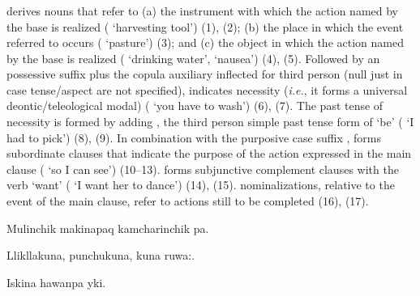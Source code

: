 {\subsubsection{}\label{sssc:con}
 derives nouns that refer to (a) the instrument with which the action named by the base is realized ( `harvesting tool') (1), (2); (b) the place in which the event referred to occurs ( `pasture') (3); and (c) the object in which the action named by the base is realized ( `drinking water',  `nausea') (4), (5). Followed by an possessive suffix plus the copula auxiliary inflected for third person (null just in case tense/aspect are not specified),  indicates necessity (\emph{i.e.}, it forms a universal deontic/teleological modal) ( `you have to wash') (6), (7). The past tense of necessity is formed by adding , the third person simple past tense form of  `be' ( `I had to pick') (8), (9). In combination with the purposive case suffix ,  forms subordinate clauses that indicate the purpose of the action expressed in the main clause ( `so I can see') (10--13).  forms subjunctive complement clauses with the verb  `want' ( `I want her to dance') (14), (15).  nominalizations, relative to the event of the main clause, refer to actions still to be completed (16), (17).

%
{Mulinchik makinapaq kamcharinchik pa.}%
{}%
{}{}%

%
{Llikllakuna, punchukuna, kuna ruwa:.}%
{}%
{}{}%

%
{Iskina hawanpa yki.}%
{}%
{}{}%

}
